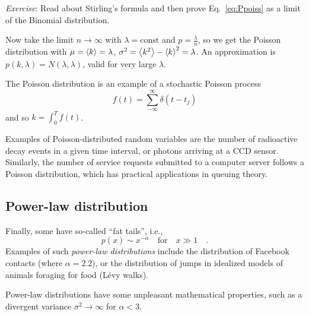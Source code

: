 \documentclass{notebook}
\newcommand{\Exercise}{\textit{Exercise}}
\begin{document}
\Exercise:
Read about Stirling's formula and then prove Eq.~\eqref{eq:Ppoiss} as a limit of the Binomial distribution.


Now take the limit $n \to \infty$ with $\lambda = \mathrm{const}$ and $p = \frac{\lambda}{n}$, so we get the Poisson distribution
%
%
with $\mu = \expval{k} = \lambda$, $\sigma^2 = \expval{k^2} - \expval{k}^2 = \lambda$. An approximation is $p(k,\lambda) = N(\lambda, \lambda)$, valid for very large $\lambda$.

\begin{remark}
	The Poisson distribution is an example of a stochastic Poisson process 
	\begin{equation}
	f(t) = \sum^{\infty}_{-\infty}{\delta(t - t_j)}
	\end{equation}
	and so $k = \int^T_0{f(t)} $.	
\end{remark}
Examples of Poisson-distributed random variables are 
the number of radioactive decay events in a given time interval, 
or photons arriving at a CCD sensor. 
Similarly, the number of service requests submitted to a computer server follows a Poisson distribution, 
which has practical applications in queuing theory.

\subsection*{Power-law distribution}
Finally, some have so-called ``fat tails'', i.e.,
\begin{equation}
p(x) \sim x^{- \alpha} \quad \mathrm{for} \quad x \gg 1 \quad.
\end{equation}
Examples of such \textit{power-law distributions} include the distribution of Facebook contacts (where $\alpha = 2.2$), 
or the distribution of jumps in idealized models of animals foraging for food (L\'evy walks).

Power-law distributions have some unpleasant mathematical properties,
such as a divergent variance $\sigma^2 \to \infty $ for $\alpha < 3$.
\end{document}
